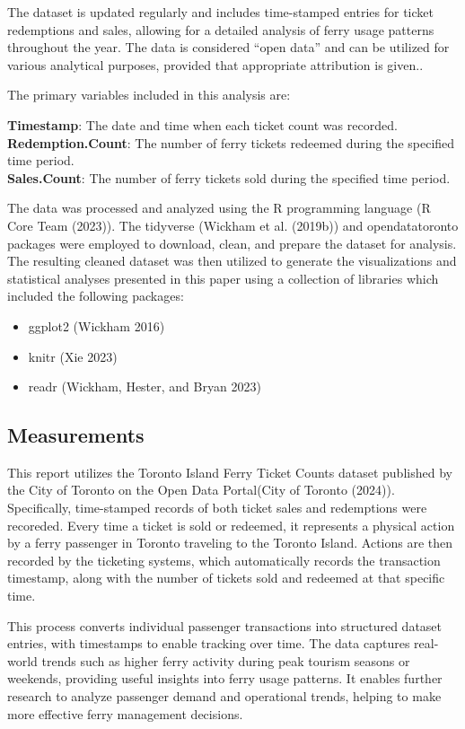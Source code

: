 \documentclass[
  letterpaper,
  DIV=11,
  numbers=noendperiod]{scrartcl}
\providecommand{\tightlist}{%
  \setlength{\itemsep}{0pt}\setlength{\parskip}{0pt}}\usepackage{longtable,booktabs,array}
\begin{document}
The dataset is updated regularly and includes time-stamped entries for
ticket redemptions and sales, allowing for a detailed analysis of ferry
usage patterns throughout the year. The data is considered ``open data''
and can be utilized for various analytical purposes, provided that
appropriate attribution is given..

The primary variables included in this analysis are:

\textbf{Timestamp}: The date and time when each ticket count was
recorded.\\
\textbf{Redemption.Count}: The number of ferry tickets redeemed during
the specified time period.\\
\textbf{Sales.Count}: The number of ferry tickets sold during the
specified time period.

The data was processed and analyzed using the R programming language (R
Core Team (2023)). The tidyverse (Wickham et al. (2019b)) and
opendatatoronto packages were employed to download, clean, and prepare
the dataset for analysis. The resulting cleaned dataset was then
utilized to generate the visualizations and statistical analyses
presented in this paper using a collection of libraries which included
the following packages:

\begin{itemize}
\tightlist
\item
  ggplot2 (Wickham 2016)
\item
  knitr (Xie 2023)
\item
  readr (Wickham, Hester, and Bryan 2023)
\end{itemize}

\subsection{Measurements}\label{measurements}

This report utilizes the Toronto Island Ferry Ticket Counts dataset
published by the City of Toronto on the Open Data Portal(City of Toronto
(2024)). Specifically, time-stamped records of both ticket sales and
redemptions were recoreded. Every time a ticket is sold or redeemed, it
represents a physical action by a ferry passenger in Toronto traveling
to the Toronto Island. Actions are then recorded by the ticketing
systems, which automatically records the transaction timestamp, along
with the number of tickets sold and redeemed at that specific time.

This process converts individual passenger transactions into structured
dataset entries, with timestamps to enable tracking over time. The data
captures real-world trends such as higher ferry activity during peak
tourism seasons or weekends, providing useful insights into ferry usage
patterns. It enables further research to analyze passenger demand and
operational trends, helping to make more effective ferry management
decisions.
\end{document}
